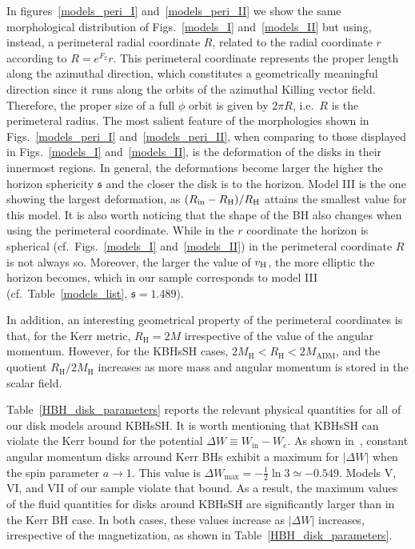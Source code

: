 \documentclass[twocolumn,aps,showpacs,showkeys,prd,superscriptaddress,byrevtex, amsmath]{revtex4-1}
\begin{document}
In figures~\ref{models_peri_I} and~\ref{models_peri_II} we show the same morphological distribution of Figs.~\ref{models_I} and~\ref{models_II} but using, instead, a perimeteral radial coordinate $R$, related to the radial coordinate $r$ according to $R = e^{F_2} r$. This perimeteral coordinate represents the proper length along the azimuthal direction, which constitutes a geometrically meaningful direction since it runs along the orbits of the azimuthal Killing vector field. Therefore, the proper size of a full $\phi$ orbit is given by $2\pi R$, i.e.~$R$ is the perimeteral radius. The most salient feature of the morphologies shown in Figs.~\ref{models_peri_I} and~\ref{models_peri_II}, when comparing to those displayed in Figs.~\ref{models_I} and~\ref{models_II}, is the deformation of the disks in their innermost regions. In general, the deformations become larger the higher the horizon sphericity $\mathfrak{s}$ and the closer the disk is to the horizon. Model III is the one showing the largest deformation, as $(R_{\rm in}-R_{\rm H})/R_{\rm H}$ attains the smallest value for this model. It is also worth noticing that the shape of the BH also changes when using the perimeteral coordinate. While in the $r$ coordinate the horizon is spherical (cf.~Figs.~\ref{models_I} and~\ref{models_II}) in the perimeteral coordinate $R$ is not always so. Moreover, the larger the value of $v_{\rm H}$, the more elliptic the horizon becomes, which in our sample corresponds to model III (cf.~Table~\ref{models_list}, $\mathfrak{s}=1.489$). 

In addition, an interesting geometrical property of the perimeteral coordinates is that, for the Kerr metric, $R_{\mathrm{H}} = 2M$ irrespective of the value of the angular momentum. However, for the KBHsSH cases, $2M_{\mathrm{H}} < R_{\mathrm{H}} < 2M_{\mathrm{ADM}}$, and the quotient $R_{\mathrm{H}}/ 2M_{\mathrm{H}}$ increases as more mass and angular momentum is stored in the scalar field. 

Table~\ref{HBH_disk_parameters} reports the relevant physical quantities for all of our disk models around KBHsSH. It is worth mentioning that KBHsSH can violate the Kerr bound for the potential $\Delta W \equiv W_{\mathrm{in}} - W_{\mathrm{c}}$. As shown in~\cite{Abramowicz:1978}, constant angular momentum disks arround Kerr BHs exhibit a maximum for $|\Delta W|$ when the spin parameter $a\rightarrow 1$. This value is $\Delta W_{\mathrm{max}} = -\frac{1}{2} \ln 3 \simeq -0.549$. Models V, VI, and VII of our sample violate that bound. As a result, the maximum values of the fluid quantities for disks around KBHsSH are significantly larger than in the Kerr BH case. In both cases, these values increase as $|\Delta W|$ increases, irrespective of the magnetization, as shown in Table~\ref{HBH_disk_parameters}.
\end{document}
